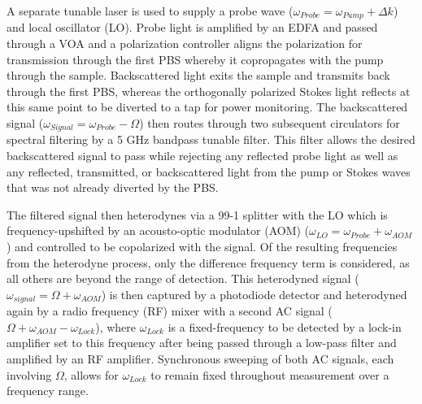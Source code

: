 \documentclass[%
  reprint,
  superscriptaddress,
  amsmath,amssymb,
  aps,
  prapplied,
]{revtex4-2}
\begin{document}
A separate tunable laser is used to supply a probe wave ($\omega_{Probe} = \omega_{Pump} + \Delta k$) and local oscillator (LO). Probe light is amplified by an EDFA and passed through a VOA and a polarization controller aligns the polarization for transmission through the first PBS whereby it copropagates with the pump through the sample. Backscattered light exits the sample and transmits back through the first PBS, whereas the orthogonally polarized Stokes light reflects at this same point to be diverted to a tap for power monitoring. The backscattered signal ($\omega_{Signal} = \omega_{Probe} - \Omega$) then routes through two subsequent circulators for spectral filtering by a 5 GHz bandpass tunable filter. This filter allows the desired backscattered signal to pass while rejecting any reflected probe light as well as any reflected, transmitted, or backscattered light from the pump or Stokes waves that was not already diverted by the PBS.

The filtered signal then heterodynes via a 99-1 splitter with the LO which is frequency-upshifted by an acousto-optic modulator (AOM) ($\omega_{LO} = \omega_{Probe} + \omega_{AOM}$) and controlled to be copolarized with the signal. Of the resulting frequencies from the heterodyne process, only the difference frequency term is considered, as all others are beyond the range of detection. This heterodyned signal ($\omega_{signal} = \Omega + \omega_{AOM}$) is then captured by a photodiode detector and heterodyned again by a radio frequency (RF) mixer with a second AC signal ($\Omega + \omega_{AOM} - \omega_{Lock}$), where $\omega_{Lock}$ is a fixed-frequency to be detected by a lock-in amplifier set to this frequency after being passed through a low-pass filter and amplified by an RF amplifier. Synchronous sweeping of both AC signals, each involving $\Omega$, allows for $\omega_{Lock}$ to remain fixed throughout measurement over a frequency range.
\end{document}
